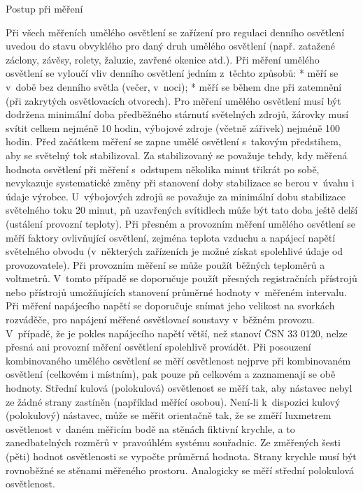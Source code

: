 \sec Postup při měření

Při všech měřeních umělého osvětlení se zařízení pro regulaci denního osvětlení uvedou do stavu
obvyklého pro daný druh umělého osvětlení (např. zatažené záclony, závěsy, rolety, žaluzie, zavřené okenice atd.).
Při měření umělého osvětlení se vyloučí vliv denního osvětlení jedním z~těchto způsobů:
\medskip
\begitems
    * měří se v~době bez denního světla (večer, v~noci);
    * měří se během dne při zatemnění (při zakrytých osvětlovacích otvorech).
\enditems
\medskip
Pro měření umělého osvětlení musí být dodržena minimální doba předběžného stárnutí světelných zdrojů,
žárovky musí svítit celkem nejméně 10 hodin, výbojové zdroje (včetně zářivek) nejméně 100 hodin.
\medskip
Před začátkem měření se zapne umělé osvětlení s~takovým předstihem, aby se světelný tok stabilizoval.
Za stabilizovaný se považuje tehdy, kdy měřená hodnota osvětlení při měření s~odstupem několika minut
třikrát po sobě, nevykazuje systematické změny při stanovení doby stabilizace se berou v~úvahu i údaje výrobce.
U~výbojových zdrojů se považuje za minimální dobu stabilizace světelného toku 20 minut, pň uzavřených
svítidlech může být tato doba ještě delší (ustálení provozní teploty).
\medskip
Při přesném a provozním měření umělého osvětlení se měří faktory ovlivňující osvětlení, zejména teplota
vzduchu a napájecí napětí světelného obvodu (v~některých zařízeních je možné získat spolehlivé údaje od
provozovatele). Při provozním měření se může použít běžných teploměrů a voltmetrů. V~tomto případě se
doporučuje použít přesných registračních přístrojů nebo přístrojů umožňujících stanovení průměrné hodnoty
v~měřeném intervalu. Při měření napájecího napětí se doporučuje snímat jeho velikost na svorkách rozváděče,
pro napájení měřené osvětlovací soustavy v~běžném provozu. V~případě, že je pokles napájecího napětí větší,
než stanoví ČSN 33 0120, nelze přesná ani provozní měření osvětlení spolehlivě provádět.
\medskip
Při posouzení kombinovaného umělého osvětlení se měří osvětlenost nejprve při kombinovaném osvětlení
(celkovém i místním), pak pouze pň celkovém a zaznamenají se obě hodnoty.
Střední kulová (polokulová) osvětlenost se měří tak, aby nástavec nebyl ze žádné strany zastíněn
(například měřící osobou). Není-li k~dispozici kulový (polokulový) nástavec, může se měřit
orientačně tak, že se změří luxmetrem osvětlenost v~daném měřicím bodě na stěnách fiktivní krychle,
a to zanedbatelných rozměrů v~pravoúhlém systému souřadnic. Ze změřených šesti (pěti) hodnot osvětlenosti
se vypočte průměrná hodnota. Strany krychle musí být rovnoběžné se stěnami měřeného prostoru.
Analogicky se měří střední polokulová osvětlenost.

